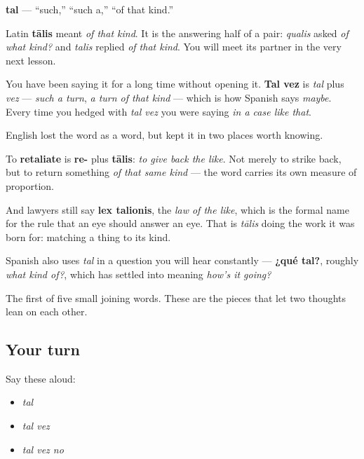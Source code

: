 \begin{cousinweb}
\textbf{tal} — \textquotedblleft{}such,\textquotedblright{} \textquotedblleft{}such a,\textquotedblright{} \textquotedblleft{}of that kind.\textquotedblright{}

Latin \textbf{tālis} meant \emph{of that kind}. It is the answering half of a pair: \emph{qualis} asked \emph{of what kind?} and \emph{talis} replied \emph{of that kind}. You will meet its partner in the very next lesson.

You have been saying it for a long time without opening it. \textbf{Tal vez} is \emph{tal} plus \emph{vez} — \emph{such a turn}, \emph{a turn of that kind} — which is how Spanish says \emph{maybe}. Every time you hedged with \emph{tal vez} you were saying \emph{in a case like that}.

English lost the word as a word, but kept it in two places worth knowing.

To \textbf{retaliate} is \textbf{re-} plus \textbf{tālis}: \emph{to give back the like}. Not merely to strike back, but to return something \emph{of that same kind} — the word carries its own measure of proportion.

And lawyers still say \textbf{lex talionis}, the \emph{law of the like}, which is the formal name for the rule that an eye should answer an eye. That is \emph{tālis} doing the work it was born for: matching a thing to its kind.

Spanish also uses \emph{tal} in a question you will hear constantly — \textbf{¿qué tal?}, roughly \emph{what kind of?}, which has settled into meaning \emph{how's it going?}
\end{cousinweb}

\begin{grammarlens}[title={What you've built}]
The first of five small joining words. These are the pieces that let two thoughts lean on each other.
\end{grammarlens}

\subsection*{Your turn}
Say these aloud:

\begin{itemize}
\raggedright
  \item \emph{tal}
  \item \emph{tal vez}
  \item \emph{tal vez no}
\end{itemize}

